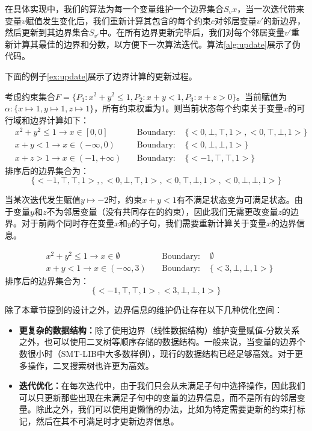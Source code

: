 在具体实现中，我们的算法为每一个变量维护一个边界集合$S_vx$，当一次迭代带来变量$v$赋值发生变化后，我们重新计算其包含的每个约束$c$对邻居变量$v'$的新边界，然后更新到其边界集合$S_{v'}$中。在所有边界更新完毕后，我们对每个邻居变量$v'$重新计算其最佳的边界和分数，以方便下一次算法迭代。算法\ref{alg:update}展示了伪代码。

下面的例子\ref{ex:update}展示了边界计算的更新过程。

\begin{example}
\label{ex:update}
考虑约束集合$F = \{P_1: x^2 + y^2 \leq 1, P_2: x + y < 1, P_3: x + z > 0\}$。当前赋值为$\alpha: \{x \mapsto 1, y \mapsto 1, z \mapsto 1\}$，所有约束权重为1。则当前状态每个约束关于变量$x$的可行域和边界计算如下：
\begin{align}
& x^2 + y^2 \leq 1  \rightarrow x \in [0, 0] \nonumber & \quad \text{Boundary: } & \{<0, \bot, \top, 1>, <0, \top, \bot, 1>\} \nonumber \\
& x + y < 1  \rightarrow x \in (-\infty, 0) \nonumber & \quad \text{Boundary: } & \{<0, \bot, \bot, 1>\} \nonumber \\
& x + z > 1  \rightarrow x \in (-1, +\infty) \nonumber & \quad \text{Boundary: } & \{<-1, \top, \top, 1>\} \nonumber
\end{align}
排序后的边界集合为：
$$
\{<-1, \top, \top, 1>, , <0, \bot, \top, 1>, <0, \top, \bot, 1>, <0, \bot, \bot, 1>\}
$$

当某次迭代发生赋值$y \mapsto -2$时，约束$x + y < 1$有不满足状态变为可满足状态。由于变量$y$和$z$不为邻居变量（没有共同存在的约束），因此我们无需更改变量$z$的边界。对于前两个同时存在变量$x$和$y$的子句，我们需要重新计算关于变量$x$的边界信息。

\begin{align}
& x^2 + y^2 \leq 1  \rightarrow x \in \emptyset \nonumber & \quad \text{Boundary: } & \emptyset \nonumber \\
& x + y < 1  \rightarrow x \in (-\infty, 3) \nonumber & \quad \text{Boundary: } & \{<3, \bot, \bot, 1>\} \nonumber
\end{align}
排序后的边界集合为：
$$
\{<-1, \top, \top, 1>, <3, \bot, \bot, 1>\}
$$
\end{example}

除了本章节提到的设计之外，边界信息的维护仍让存在以下几种优化空间：
\begin{itemize}
    \item \textbf{更复杂的数据结构：}除了使用边界（线性数据结构）维护变量赋值-分数关系之外，也可以使用二叉树等顺序存储的数据结构。一般来说，当变量的边界个数很小时（SMT-LIB中大多数样例），现行的数据结构已经足够高效。对于更多操作，二叉搜索树也许更为高效。
    \item \textbf{迭代优化：}在每次迭代中，由于我们只会从未满足子句中选择操作，因此我们可以只更新那些出现在未满足子句中的变量的边界信息，而不是所有的邻居变量。除此之外，我们可以使用更懒惰的办法，比如为特定需要更新的约束打标记，然后在其不可满足时才更新边界信息。
\end{itemize}


